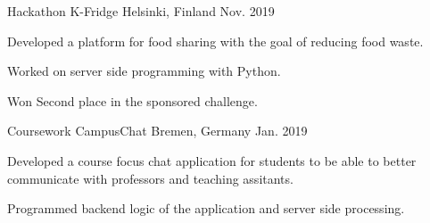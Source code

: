 

\begin{cventries}
\cventry
{Hackathon} %
{K-Fridge} %
{Helsinki, Finland} %
{Nov. 2019} %
{
  \begin{cvitems} %
    \item {Developed a platform for food sharing with the goal of reducing food waste.}
    \item {Worked on server side programming with Python.}
    \item {Won Second place in the sponsored challenge.}
  \end{cvitems}
}
  \cventry
    {Coursework} %
    {CampusChat} %
    {Bremen, Germany} %
    {Jan. 2019} %
    {
      \begin{cvitems} %
        \item {Developed a course focus chat application for students to be able to better communicate with professors and teaching assitants.}
        \item {Programmed backend logic of the application and server side processing.}
      \end{cvitems}
    }

\end{cventries}

